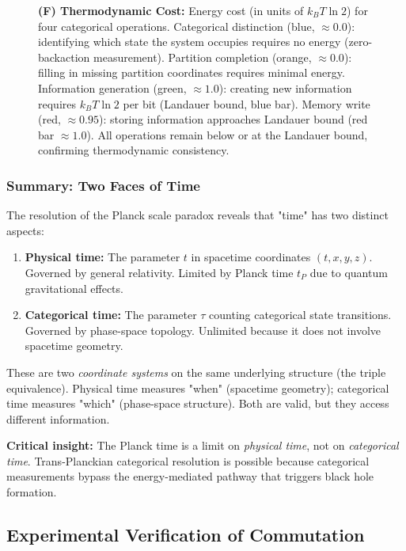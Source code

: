 \documentclass[twocolumn,10pt]{article}
\theoremstyle{remark}
\begin{document}
\begin{figure}[!htbp]
{\textbf{(F) Thermodynamic Cost:} Energy cost (in units of $k_B T \ln 2$) for four categorical operations. Categorical distinction (blue, $\approx 0.0$): identifying which state the system occupies requires no energy (zero-backaction measurement). Partition completion (orange, $\approx 0.0$): filling in missing partition coordinates requires minimal energy. Information generation (green, $\approx 1.0$): creating new information requires $k_B T \ln 2$ per bit (Landauer bound, blue bar). Memory write (red, $\approx 0.95$): storing information approaches Landauer bound (red bar $\approx 1.0$). All operations remain below or at the Landauer bound, confirming thermodynamic consistency.}
\label{fig:information_catalysis}
\end{figure}

\subsubsection{Summary: Two Faces of Time}

The resolution of the Planck scale paradox reveals that "time" has two distinct aspects:

\begin{enumerate}
    \item \textbf{Physical time:} The parameter $t$ in spacetime coordinates $(t, x, y, z)$. Governed by general relativity. Limited by Planck time $t_P$ due to quantum gravitational effects.

    \item \textbf{Categorical time:} The parameter $\tau$ counting categorical state transitions. Governed by phase-space topology. Unlimited because it does not involve spacetime geometry.
\end{enumerate}

These are two \textit{coordinate systems} on the same underlying structure (the triple equivalence). Physical time measures "when" (spacetime geometry); categorical time measures "which" (phase-space structure). Both are valid, but they access different information.

\textbf{Critical insight:} The Planck time is a limit on \textit{physical time}, not on \textit{categorical time}. Trans-Planckian categorical resolution is possible because categorical measurements bypass the energy-mediated pathway that triggers black hole formation.

\subsection{Experimental Verification of Commutation}
\end{document}

